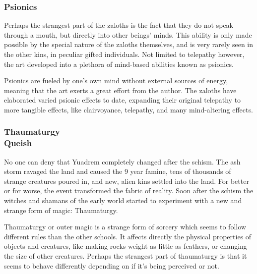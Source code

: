 \subsubsection{Psionics} %
Perhaps the strangest part of the zaloths is the fact that they do not speak through a mouth, but directly into other beings' minds.
This ability is only made possible by the special nature of the zaloths themselves, and is very rarely seen in the other kins, in peculiar gifted individuals.
Not limited to telepathy however, the art developed into a plethora of mind-based abilities known as psionics.

Psionics are fueled by one's own mind without external sources of energy, meaning that the art exerts a great effort from the author.
The zaloths have elaborated varied psionic effects to date, expanding their original telepathy to more tangible effects, like clairvoyance, telepathy, and many mind-altering effects.


\subsubsection{Thaumaturgy\\ \small{Queish}} %

No one can deny that Yuadrem completely changed after the schism.
The ash storm ravaged the land and caused the 9 year famine, tens of thousands of strange creatures poured in, and new, alien kins settled into the land.
For better or for worse, the event transformed the fabric of reality.
Soon after the schism the witches and shamans of the early world started to experiment with a new and strange form of magic: Thaumaturgy.

Thaumaturgy or outer magic is a strange form of sorcery which seems to follow different rules than the other schools.
It affects directly the physical properties of objects and creatures, like making rocks weight as little as feathers, or changing the size of other creatures.
Perhaps the strangest part of thaumaturgy is that it seems to behave differently depending on if it's being perceived or not.%

